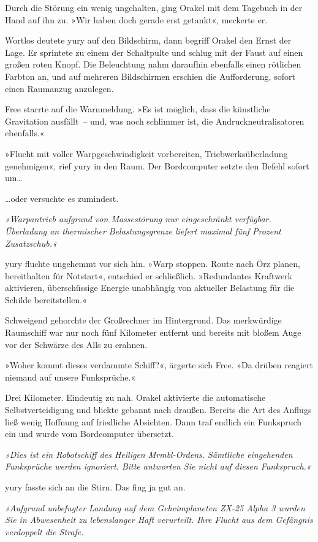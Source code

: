 Durch die Störung ein wenig ungehalten, ging Orakel mit dem Tagebuch in der Hand auf ihn zu. »Wir haben doch gerade erst getankt«, meckerte er.

Wortlos deutete yury auf den Bildschirm, dann begriff Orakel den Ernst der Lage. Er sprintete zu einem der Schaltpulte und schlug mit der Faust auf einen großen roten Knopf. Die Beleuchtung nahm daraufhin ebenfalls einen rötlichen Farbton an, und auf mehreren Bildschirmen erschien die Aufforderung, sofort einen Raumanzug anzulegen.

Free starrte auf die Warnmeldung. »Es ist möglich, dass die künstliche Gravitation ausfällt~– und, was noch schlimmer ist, die Andruckneutralisatoren ebenfalls.«

»Flucht mit voller Warpgeschwindigkeit vorbereiten, Triebwerksüberladung genehmigen«, rief yury in den Raum. Der Bordcomputer setzte den Befehl sofort um…

…oder versuchte es zumindest.

\textit{»Warpantrieb aufgrund von Massestörung nur eingeschränkt verfügbar. Überladung an thermischer Belastungsgrenze liefert maximal fünf Prozent Zusatzschub.«}

yury fluchte ungehemmt vor sich hin. »Warp stoppen. Route nach Örz planen, bereithalten für Notstart«, entschied er schließlich. »Redundantes Kraftwerk aktivieren, überschüssige Energie unabhängig von aktueller Belastung für die Schilde bereitstellen.«

Schweigend gehorchte der Großrechner im Hintergrund. Das merkwürdige Raumschiff war nur noch fünf Kilometer entfernt und bereits mit bloßem Auge vor der Schwärze des Alls zu erahnen.

»Woher kommt dieses verdammte Schiff?«, ärgerte sich Free. »Da drüben reagiert niemand auf unsere Funksprüche.«

Drei Kilometer. Eindeutig zu nah. Orakel aktivierte die automatische Selbstverteidigung und blickte gebannt nach draußen. Bereits die Art des Anflugs ließ wenig Hoffnung auf friedliche Absichten. Dann traf endlich ein Funkspruch ein und wurde vom Bordcomputer übersetzt.

\textit{»Dies ist ein Robotschiff des Heiligen Mrmbl-Ordens. Sämtliche eingehenden Funksprüche werden ignoriert. Bitte antworten Sie nicht auf diesen Funkspruch.«}

yury fasste sich an die Stirn. Das fing ja gut an.

\textit{»Aufgrund unbefugter Landung auf dem Geheimplaneten ZX-25 Alpha 3 wurden Sie in Abwesenheit zu lebenslanger Haft verurteilt. Ihre Flucht aus dem Gefängnis verdoppelt die Strafe.}

